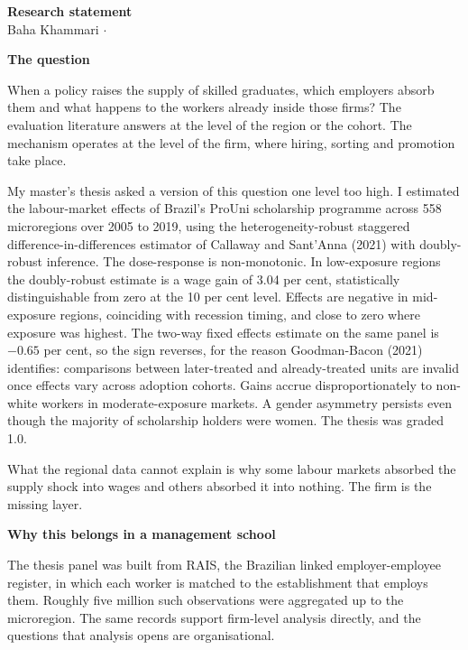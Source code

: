 \documentclass[a4paper,11pt]{article}
\newcommand{\sectionrule}[1]{\vspace{1.5mm}\noindent\textbf{#1}\par\vspace{-0.4em}}
\begin{document}
\begin{center}
{\large\bfseries Research statement}\\[3pt]
{\normalsize Baha Khammari} \quad$\cdot$
\end{center}

\vspace{4mm}

\sectionrule{The question}

When a policy raises the supply of skilled graduates, which employers absorb them and what happens to the workers already inside those firms? The evaluation literature answers at the level of the region or the cohort. The mechanism operates at the level of the firm, where hiring, sorting and promotion take place.

My master's thesis asked a version of this question one level too high. I estimated the labour-market effects of Brazil's ProUni scholarship programme across 558 microregions over 2005 to 2019, using the heterogeneity-robust staggered difference-in-differences estimator of Callaway and Sant'Anna (2021) with doubly-robust inference. The dose-response is non-monotonic. In low-exposure regions the doubly-robust estimate is a wage gain of 3.04 per cent, statistically distinguishable from zero at the 10 per cent level. Effects are negative in mid-exposure regions, coinciding with recession timing, and close to zero where exposure was highest. The two-way fixed effects estimate on the same panel is $-0.65$ per cent, so the sign reverses, for the reason Goodman-Bacon (2021) identifies: comparisons between later-treated and already-treated units are invalid once effects vary across adoption cohorts. Gains accrue disproportionately to non-white workers in moderate-exposure markets. A gender asymmetry persists even though the majority of scholarship holders were women. The thesis was graded 1.0.

What the regional data cannot explain is why some labour markets absorbed the supply shock into wages and others absorbed it into nothing. The firm is the missing layer.

\sectionrule{Why this belongs in a management school}

The thesis panel was built from RAIS, the Brazilian linked employer-employee register, in which each worker is matched to the establishment that employs them. Roughly five million such observations were aggregated up to the microregion. The same records support firm-level analysis directly, and the questions that analysis opens are organisational.
\end{document}
